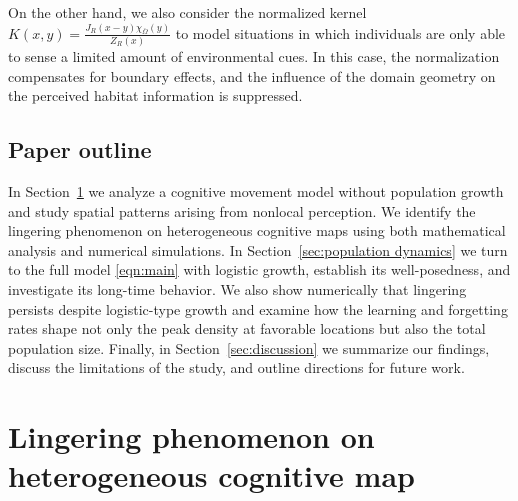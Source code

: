\documentclass{article}
\begin{document}
On the other hand, we also consider the normalized kernel $K(x,y)=\frac{J_R(x-y)\chi_{\bar \Omega} (y)}{Z_R(x)}$ to model situations in which individuals are only able to sense a limited amount of environmental cues. In this case, the normalization compensates for boundary effects, and the influence of the domain geometry on the perceived habitat information is suppressed.

\subsection{Paper outline}
In Section~\ref{sec:lingering from dispersal} we analyze a cognitive movement model without population growth and study spatial patterns arising from nonlocal perception. 
We identify the lingering phenomenon on heterogeneous cognitive maps using both mathematical analysis and numerical simulations.
In Section~\ref{sec:population dynamics} we turn to the full model \eqref{eqn:main} with logistic growth, establish its well-posedness, and investigate its long-time behavior. 
We also show numerically that lingering persists despite logistic-type growth and examine how the learning and forgetting rates shape not only the peak density at favorable locations but also the total population size. 
Finally, in Section~\ref{sec:discussion} we summarize our findings, discuss the limitations of the study, and outline directions for future work.




\section{Lingering phenomenon on heterogeneous cognitive map}\label{sec:lingering from dispersal}
\end{document}

